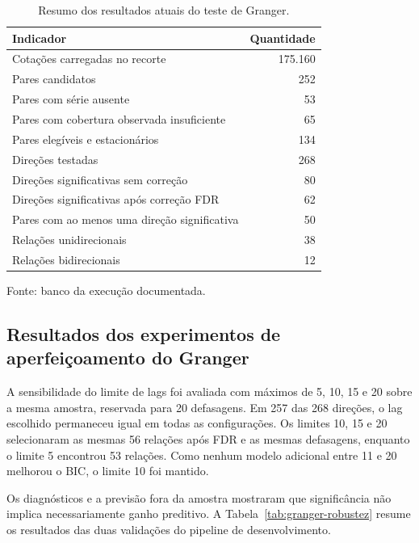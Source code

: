 \documentclass[12pt,a4paper]{article}
\begin{document}
\begin{table}[htbp]
    \centering
    \caption{Resumo dos resultados atuais do teste de Granger.}
    \label{tab:granger-resultados}
    \small
    \begin{tabular}{lr}
        \toprule
        \textbf{Indicador} & \textbf{Quantidade} \\
        \midrule
        Cotações carregadas no recorte & 175.160 \\
        Pares candidatos & 252 \\
        Pares com série ausente & 53 \\
        Pares com cobertura observada insuficiente & 65 \\
        Pares elegíveis e estacionários & 134 \\
        Direções testadas & 268 \\
        Direções significativas sem correção & 80 \\
        Direções significativas após correção FDR & 62 \\
        Pares com ao menos uma direção significativa & 50 \\
        Relações unidirecionais & 38 \\
        Relações bidirecionais & 12 \\
        \bottomrule
    \end{tabular}

    \par\smallskip
    \footnotesize
    Fonte: banco  da execução documentada.
\end{table}

\subsection{Resultados dos experimentos de aperfeiçoamento do Granger}

A sensibilidade do limite de lags foi avaliada com máximos de 5, 10, 15 e 20
sobre a mesma amostra, reservada para 20 defasagens. Em 257 das 268 direções, o
lag escolhido permaneceu igual em todas as configurações. Os limites 10, 15 e
20 selecionaram as mesmas 56 relações após FDR e as mesmas defasagens, enquanto
o limite 5 encontrou 53 relações. Como nenhum modelo adicional entre 11 e 20
melhorou o BIC, o limite 10 foi mantido.

Os diagnósticos e a previsão fora da amostra mostraram que significância não
implica necessariamente ganho preditivo. A Tabela~\ref{tab:granger-robustez}
resume os resultados das duas validações do pipeline de desenvolvimento.
\end{document}
